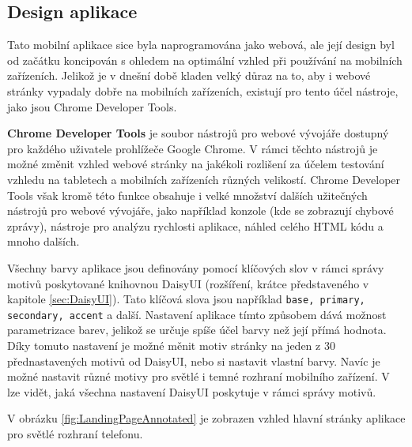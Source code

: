 \subsection{Design aplikace}\label{sec:DesignAplikace}

Tato mobilní aplikace sice byla naprogramována jako webová, ale její design byl od začátku koncipován s ohledem na optimální vzhled při používání na mobilních zařízeních. Jelikož je v dnešní době kladen velký důraz na to, aby i webové stránky vypadaly dobře na mobilních zařízeních, existují pro tento účel nástroje, jako jsou Chrome Developer Tools.

\textbf{Chrome Developer Tools} je soubor nástrojů pro webové vývojáře dostupný pro každého uživatele prohlížeče Google Chrome. V rámci těchto nástrojů je možné změnit vzhled webové stránky na jakékoli rozlišení za účelem testování vzhledu na tabletech a mobilních zařízeních různých velikostí. Chrome Developer Tools však kromě této funkce obsahuje i velké množství dalších užitečných nástrojů pro webové vývojáře, jako například konzole (kde se zobrazují chybové zprávy), nástroje pro analýzu rychlosti aplikace, náhled celého HTML kódu a mnoho dalších.

Všechny barvy aplikace jsou definovány pomocí klíčových slov v rámci správy motivů poskytované knihovnou DaisyUI (rozšíření, krátce představeného v kapitole \ref{sec:DaisyUI}). Tato klíčová slova jsou například \texttt{base, primary, secondary, accent} a další. Nastavení aplikace tímto způsobem dává možnost parametrizace barev, jelikož se určuje spíše účel barvy než její přímá hodnota. Díky tomuto nastavení je možné měnit motiv stránky na jeden z 30 přednastavených motivů od DaisyUI, nebo si nastavit vlastní barvy. Navíc je možné nastavit různé motivy pro světlé i temné rozhraní mobilního zařízení. V \cite{DaisyUIthemeGenerator} lze vidět, jaká všechna nastavení DaisyUI poskytuje v rámci správy motivů.

V obrázku \ref{fig:LandingPageAnnotated} je zobrazen vzhled hlavní stránky aplikace pro světlé rozhraní telefonu.

